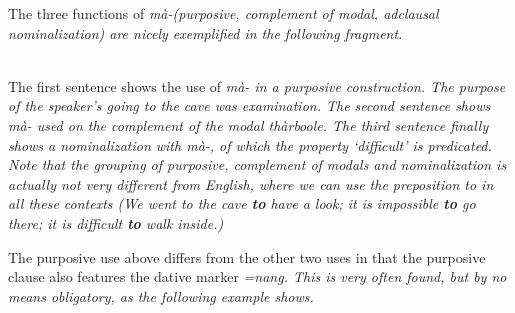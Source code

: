 The three functions of \em mà-\em (purposive, complement of modal, adclausal nominalization) are nicely exemplified in the following fragment.

\\ 

The first sentence shows the use of \em mà- \em in a purposive construction. The purpose of the speaker's going to the cave was examination. The second sentence shows \em mà- \em used on the complement of the modal \em thàrboole\em. The third sentence finally shows a  nominalization with \em mà-\em, of which the property `difficult' is predicated. Note that the grouping of purposive, complement of modals and nominalization is actually not very different from English, where we can use the preposition \em to \em in all these contexts (\em We went to the cave \textbf{to} have  a look; it is impossible \textbf{to} go there; it is difficult \textbf{to} walk inside.\em)

The purposive use above differs from the other two uses in that the purposive clause also features the dative marker \em =nang\em. This is very often found, but by no means obligatory, as the following example shows.

\\  
 

